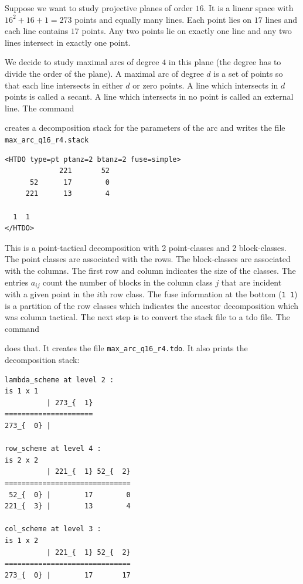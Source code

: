 \bigskip

Suppose we want to study projective planes of order $16.$ 
It is a linear space with $16^2+16+1=273$ points and equally many lines. 
Each point lies on $17$ lines and each line contains $17$ points. 
Any two points lie on exactly one line and any two lines intersect in exactly one point.

\bigskip

We decide to 
study maximal arcs of degree $4$ in this plane (the degree has to divide the order of the plane).
A maximal arc of degree $d$ is a set of points so that each line intersects in either $d$ or zero points.
A line which intersects in $d$ points is called a secant.  
A line which intersects in no point is called an external line.
The command 
{\tt

}
creates a decomposition stack for the parameters of the arc and writes the file \verb'max_arc_q16_r4.stack' 
\begin{verbatim}
<HTDO type=pt ptanz=2 btanz=2 fuse=simple>
             221       52 
      52      17        0 
     221      13        4 

  1  1
</HTDO>
\end{verbatim}
This is a point-tactical decomposition with 2 point-classes and 2 block-classes. 
The point classes are associated with the rows. 
The block-classes are associated with the columns. 
The first row and column indicates the size of the classes.
The entries $a_{ij}$ count the number of blocks in the column class $j$ 
that are incident with a given point in the $i$th row  class.
The fuse information at the bottom (\verb'1 1') 
is a partition of the row classes which indicates the ancestor decomposition which was column tactical.
The next step is to convert the stack file to a tdo file.
The command
{\tt

}
does that. 
It creates the file \verb'max_arc_q16_r4.tdo'. It also 
prints the decomposition stack:
\begin{verbatim}
lambda_scheme at level 2 : 
is 1 x 1
          | 273_{  1}
=====================
273_{  0} | 

row_scheme at level 4 : 
is 2 x 2
          | 221_{  1} 52_{  2}
==============================
 52_{  0} |        17        0
221_{  3} |        13        4

col_scheme at level 3 : 
is 1 x 2
          | 221_{  1} 52_{  2}
==============================
273_{  0} |        17       17
\end{verbatim}
